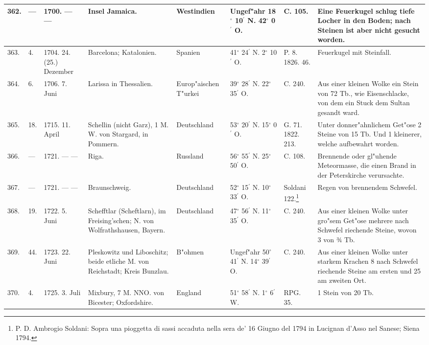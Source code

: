 \documentclass[a4paper, 8pt, oneside, polutonikogreek, german]{article}
\begin{document}
\begin{center}
\begin{longtable}{| p{4mm} | p{2mm} | p{15mm} | p{25mm} | p{16mm} | p{12mm} | p{13mm} | p{20mm} |}
        362. & --- & 1700. --- --- & Insel Jamaica. & Westindien & Ungef"ahr 18$^\circ$ 10$^\prime$ N. 42$^\circ$ 0$^\prime$ O. & C. 105. & Eine Feuerkugel schlug tiefe Locher in den Boden; nach Steinen ist aber nicht gesucht worden. \\ \hline
        363. & 4. & 1704. 24. (25.) Dezember & Barcelona; Katalonien. & Spanien & 41$^\circ$ 24$^\prime$ N. 2$^\circ$ 10$^\prime$ O. & P. 8. 1826. 46. & Feuerkugel mit Steinfall. \\ \hline
        364. & 6. & 1706. 7. Juni & Larissa in Thessalien. & Europ"aischen T"urkei & 39$^\circ$ 28$^\prime$ N. 22$^\circ$ 35$^\prime$ O. & C. 240. & Aus einer kleinen Wolke ein Stein von 72 Tb., wie Eisenschlacke, von dem ein Stuck dem Sultan gesandt ward. \\ \hline
        365. & 18. & 1715. 11. April & Schellin (nicht Garz), 1 M. W. von Stargard, in Pommern. & Deutschland & 53$^\circ$ 20$^\prime$ N. 15$^\circ$ 0$^\prime$ O. & G. 71. 1822. 213. & Unter donner"ahnlichem Get"ose 2 Steine von 15 Tb. Und 1 kleinerer, welche aufbewahrt worden. \\ \hline
        366. & --- & 1721. --- --- & Riga. & Russland & 56$^\circ$ 55$^\prime$ N. 25$^\circ$ 50$^\prime$ O. & C. 108. & Brennende oder gl"uhende Meteormasse, die einen Brand in der Peterskirche verursachte. \\ \hline
        367. & --- & 1721. --- --- & Braunschweig. & Deutschland & 52$^\circ$ 15$^\prime$ N. 10$^\circ$ 33$^\prime$ O. & Soldani 122.\footnote{P. D. Ambrogio Soldani: Sopra una pioggetta di sassi accaduta nella sera de' 16 Giugno del 1794 in Lucignan d'Asso nel Sanese; Siena 1794.} & Regen von brennendem Schwefel. \\ \hline
        368. & 19. & 1722. 5. Juni & Schefftlar (Scheftlarn), im Freising’schen; N. von Wolfrathshausen, Bayern. & Deutschland & 47$^\circ$ 56$^\prime$ N. 11$^\circ$ 35$^\prime$ O. & C. 240. & Aus einer kleinen Wolke unter gro"sem Get"ose mehrere nach Schwefel riechende Steine, wovon 3 von ¾ Tb. \\ \hline
        369. & 44. & 1723. 22. Juni & Pleskowitz und Liboschitz; beide etliche M. von Reichstadt; Kreis Bunzlau. & B"ohmen & Ungef"ahr 50$^\circ$ 41$^\prime$ N. 14$^\circ$ 39$^\prime$ O. & C. 240. & Aus einer kleinen Wolke unter starkem Krachen 8 nach Schwefel riechende Steine am ersten und 25 am zweiten Ort. \\ \hline
        370. & 4. & 1725. 3. Juli & Mixbury, 7 M. NNO. von Bicester; Oxfordshire. & England & 51$^\circ$ 58$^\prime$ N. 1$^\circ$ 6$^\prime$ W. & RPG. 35. & 1 Stein von 20 Tb. \\ \hline

\end{longtable}
\end{center}
\end{document}
